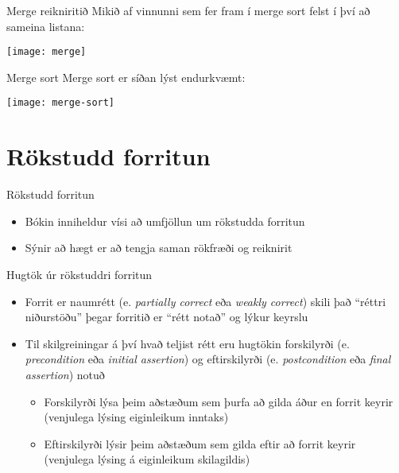 \documentclass[handout]{beamer}
\begin{document}
\begin{frame}{Merge reikniritið}
Mikið af vinnunni sem fer fram í merge sort felst í því að sameina listana:
\begin{center}
\texttt{[image: merge]}
\end{center}
\end{frame}

\begin{frame}{Merge sort}
Merge sort er síðan lýst endurkvæmt:
\begin{center}
\texttt{[image: merge-sort]}
\end{center}
\end{frame}

\section{Rökstudd forritun}

\begin{frame}{Rökstudd forritun}
\begin{itemize}
 \item Bókin inniheldur vísi að umfjöllun um rökstudda forritun
 \item Sýnir að hægt er að tengja saman rökfræði og reiknirit
\end{itemize}
\end{frame}

\begin{frame}{Hugtök úr rökstuddri forritun}
\begin{itemize}
 \item Forrit er naumrétt (e. \emph{partially correct} eða \emph{weakly correct}) skili það ``réttri niðurstöðu'' þegar forritið er ``rétt notað'' og lýkur keyrslu
 \item Til skilgreiningar á því hvað teljist rétt eru hugtökin forskilyrði (e. \emph{precondition} eða \emph{initial assertion}) og eftirskilyrði (e. \emph{postcondition} eða \emph{final assertion}) notuð
 \begin{itemize}
  \item Forskilyrði lýsa þeim aðstæðum sem þurfa að gilda áður en forrit keyrir (venjulega lýsing eiginleikum inntaks)
  \item Eftirskilyrði lýsir þeim aðstæðum sem gilda eftir að forrit keyrir (venjulega lýsing á eiginleikum skilagildis)
 \end{itemize}
\end{itemize}
\end{frame}
\end{document}

